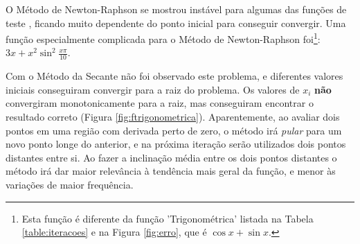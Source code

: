 \documentclass[final,5p]{elsarticle}
\numberwithin{equation}{section}
\begin{document}
    \begin{figure*}
        \caption{Evolução do erro do Método da Secante com diferentes funções (linhas tracejadas representam $\varepsilon_{i+1} / \varepsilon_i = 0.5$ e $\varepsilon_{i+1} / \varepsilon_i^2 = 0.5$).}
        \label{fig:erro}
    \end{figure*}

    O Método de Newton-Raphson se mostrou instável para algumas das funções de teste \cite{relatorionewtonraphson}, ficando muito dependente do ponto inicial para conseguir convergir. Uma função especialmente complicada para o Método de Newton-Raphson foi\footnote{Esta função é diferente da função 'Trigonométrica' listada na Tabela \ref{table:iteracoes} e na Figura \ref{fig:erro}, que é $\cos x + \sin x$.}: $3x + x^2 \sin^2 \frac{x\pi}{10}$.

    Com o Método da Secante não foi observado este problema, e diferentes valores iniciais conseguiram convergir para a raiz do problema. Os valores de $x_i$ \textbf{não} convergiram monotonicamente para a raiz, mas conseguiram encontrar o resultado correto (Figura \ref{fig:ftrigonometrica}). Aparentemente, ao avaliar dois pontos em uma região com derivada perto de zero, o método irá \emph{pular} para um novo ponto longe do anterior, e na próxima iteração serão utilizados dois pontos distantes entre si. Ao fazer a inclinação média entre os dois pontos distantes o método irá dar maior relevância à tendência mais geral da função, e menor às variações de maior frequência.
\end{document}
